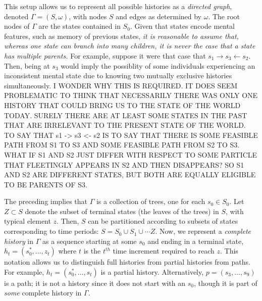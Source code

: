 \documentclass[
11pt,
titlepage,
reqno,
]{article}%
\theoremstyle{definition}
\begin{document}
	This setup allows us to represent all possible histories as a \textit{directed graph}, denoted $\Gamma=(S,\omega)$, with nodes $S$ and edges as determined by  $\omega$.  
	The root nodes of $\Gamma$ are the states contained in $S_0$. 
	Given that states encode mental features, such as memory of previous states,  \textit{it is reasonable to assume that, whereas one state can branch into many  children, it is never the case that a state has multiple parents.} 
	For example, suppose it were that case that $s_1\rightarrow s_3\leftarrow s_2$. 
	Then, being at $s_3$ would imply the possiblity of some individuals experiencing an inconsistent mental state due to knowing two mutually exclusive histories simultaneously. 
	I WONDER WHY THIS IS REQUIRED. IT DOES SEEM PROBLEMATIC TO THINK THAT NECESSARILY THERE WAS ONLY ONE HISTORY THAT COULD BRING US TO THE STATE OF THE WORLD TODAY. SURELY THERE ARE AT LEAST SOME STATES IN THE PAST THAT ARE IRRELEVANT TO THE PRESENT STATE OF THE WORLD. TO SAY THAT s1 -> s3 <- s2 IS TO SAY THAT THERE IS SOME FEASIBLE PATH FROM S1 TO S3 AND SOME FEASIBLE PATH FROM S2 TO S3. WHAT IF S1 AND S2 JUST DIFFER WITH RESPECT TO SOME PARTICLE THAT FLEETINGLY APPEARS IN S2 AND THEN DISAPPEARS? SO S1 AND S2 ARE DIFFERENT STATES, BUT BOTH ARE EQUALLY ELIGIBLE TO BE PARENTS OF S3.
	
	The preceding implies that  $\Gamma$ is a collection of trees, one for each $s_0\in S_0$. 
	Let $Z\subset S$ denote the subset of terminal states (the leaves of the trees) in $S$, with typical element $z$.
	Then, $S$ can be partitioned according to  subsets of states corresponding to time periods: $S=S_0\cup S_1\cup \cdots Z$.
	Now, we represent a \textit{complete history} in $\Gamma$ as a sequence starting at some $s_0$ and ending in a terminal state,  $h_t=(s_0^\ast,\ldots,z_t)$ where $t$ is the $t^{th}$ time increment required to reach $z$. 
	This notation allows us to distinguish full histories from partial histories from paths. 
	For example, $h_t=(s_0^\ast,\ldots,s_t)$ is a partial history.
	Alternatively,  $p=(s_3,\ldots,s_9)$ is a path; it is not a history since it does not start with an $s_0$, though it is  part of \textit{some} complete history in $\Gamma$.
	
	
	
\end{document}
